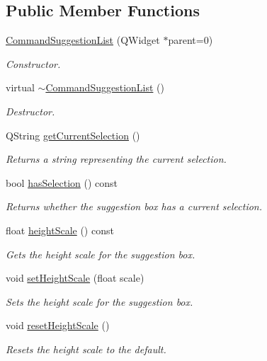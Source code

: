 \subsection*{Public Member Functions}
\begin{DoxyCompactItemize}
\item 
\hyperlink{class_command_suggestion_list_aa6cd6f32861900fb5c0280375ee45969}{Command\-Suggestion\-List} (Q\-Widget $\ast$parent=0)
\begin{DoxyCompactList}\small\item\em Constructor. \end{DoxyCompactList}\item 
\hypertarget{class_command_suggestion_list_abc4ba5513dccfc66cddff8e028e73240}{virtual \hyperlink{class_command_suggestion_list_abc4ba5513dccfc66cddff8e028e73240}{$\sim$\-Command\-Suggestion\-List} ()}\label{class_command_suggestion_list_abc4ba5513dccfc66cddff8e028e73240}

\begin{DoxyCompactList}\small\item\em Destructor. \end{DoxyCompactList}\item 
Q\-String \hyperlink{class_command_suggestion_list_ae8f5411f7b8b3b4f86da8278951b448e}{get\-Current\-Selection} ()
\begin{DoxyCompactList}\small\item\em Returns a string representing the current selection. \end{DoxyCompactList}\item 
bool \hyperlink{class_command_suggestion_list_afc4dc846e366ece3bf77651fd92a7392}{has\-Selection} () const 
\begin{DoxyCompactList}\small\item\em Returns whether the suggestion box has a current selection. \end{DoxyCompactList}\item 
float \hyperlink{class_command_suggestion_list_a1430f35686d3572b51ebba9730083c97}{height\-Scale} () const 
\begin{DoxyCompactList}\small\item\em Gets the height scale for the suggestion box. \end{DoxyCompactList}\item 
void \hyperlink{class_command_suggestion_list_a5a05acbd3c0be81cb2fe7d2579cdb9a5}{set\-Height\-Scale} (float scale)
\begin{DoxyCompactList}\small\item\em Sets the height scale for the suggestion box. \end{DoxyCompactList}\item 
\hypertarget{class_command_suggestion_list_aedf54e67475b3d8e7ae116610de152a3}{void \hyperlink{class_command_suggestion_list_aedf54e67475b3d8e7ae116610de152a3}{reset\-Height\-Scale} ()}\label{class_command_suggestion_list_aedf54e67475b3d8e7ae116610de152a3}

\begin{DoxyCompactList}\small\item\em Resets the height scale to the default. \end{DoxyCompactList}\end{DoxyCompactItemize}
